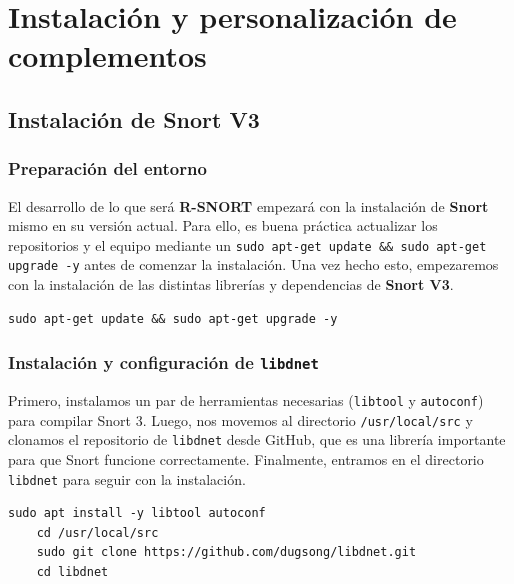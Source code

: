 \documentclass[11pt,a4paper,twoside]{report}
\begin{document}
\newpage

\section{Instalación y personalización de complementos}
\subsection{Instalación de Snort V3}

\subsubsection*{Preparación del entorno}

El desarrollo de lo que será \textbf{R-SNORT} empezará con la instalación de \textbf{Snort} \cite{snort3_installation_pdf} mismo en su versión actual. Para ello, es buena práctica actualizar los repositorios y el equipo mediante un \lstinline|sudo apt-get update && sudo apt-get upgrade -y| antes de comenzar la instalación. Una vez hecho esto, empezaremos con la instalación de las distintas librerías y dependencias de \textbf{Snort V3}.

\begin{lstlisting}[style=commandstyle, caption={Actualización del sistema antes de instalar dependencias}]
	sudo apt-get update && sudo apt-get upgrade -y
\end{lstlisting}

\subsubsection*{Instalación y configuración de \texttt{libdnet}}

Primero, instalamos un par de herramientas necesarias (\texttt{libtool} y \texttt{autoconf}) para compilar Snort 3. Luego, nos movemos al directorio \texttt{/usr/local/src} y clonamos el repositorio de \texttt{libdnet} desde GitHub, que es una librería importante para que Snort funcione correctamente. Finalmente, entramos en el directorio \texttt{libdnet} para seguir con la instalación.

\begin{lstlisting}[style=commandstyle, caption={Instalación y clonación de libdnet desde GitHub}]
	sudo apt install -y libtool autoconf
	cd /usr/local/src
	sudo git clone https://github.com/dugsong/libdnet.git
	cd libdnet
\end{lstlisting}
\end{document}

